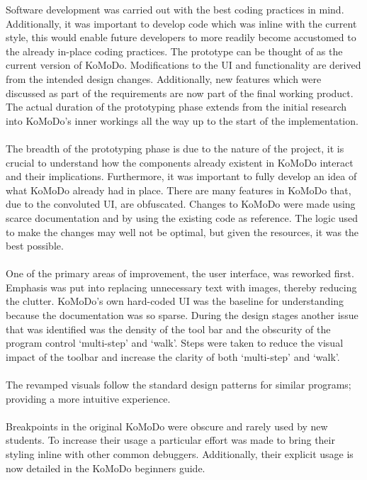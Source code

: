   Software development was carried out with the best coding practices in mind. Additionally, it was important to develop code which was inline with the current style, this would enable future developers to more readily become accustomed to the already in-place coding practices.
  The prototype can be thought of as the current version of KoMoDo. Modifications to the UI and functionality are derived from the intended design changes. Additionally, new features which were discussed as part of the requirements are now part of the final working product. The actual duration of the prototyping phase extends from the initial research into KoMoDo's inner workings all the way up to the start of the implementation. \\\\
  The breadth of the prototyping phase is due to the nature of the project, it is crucial to understand how the components already existent in KoMoDo interact and their implications. Furthermore, it was important to fully develop an idea of what KoMoDo already had in place. There are many features in KoMoDo that, due to the convoluted UI, are obfuscated.
  Changes to KoMoDo were made using scarce  documentation and by using the existing code as reference. The logic used to make the changes may well not be optimal, but given the resources, it was the best possible.\\\\
  One of the primary areas of improvement, the user interface, was reworked first. Emphasis was put into replacing unnecessary text with images, thereby reducing the clutter. KoMoDo's own hard-coded UI was the baseline for understanding  because the documentation was so sparse.
  \pagebreak
  During the design stages another issue that was identified was the density of the tool bar and the obscurity of the program control `multi-step' and `walk'. Steps were taken to reduce the visual impact of the toolbar and increase the clarity of both `multi-step' and `walk'.\\\\
  The revamped visuals follow the standard design patterns for similar programs; providing a more intuitive experience.\\\\
  Breakpoints in the original KoMoDo were obscure and rarely used by new students. To increase their usage a particular effort was made to bring their styling inline with other common debuggers. Additionally, their explicit usage is now detailed in the KoMoDo beginners guide.\\\\

